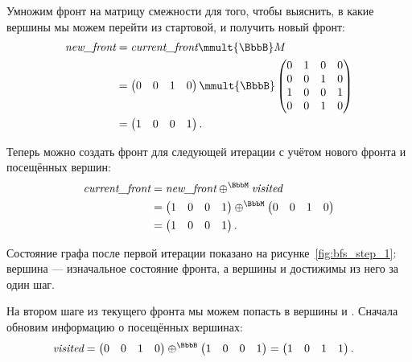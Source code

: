 \begin{example}
    Умножим фронт на матрицу смежности для того, чтобы выяснить, в какие вершины мы можем перейти из стартовой, и получить новый фронт:
    \begin{align*}
        \emph{new\_front} & = \emph{current\_front} \mmult{\BbbB} M \\
                          & =
        \begin{pmatrix}
            0 & 0 & 1 & 0
        \end{pmatrix} \mmult{\BbbB}
        \begin{pmatrix}
            0 & 1 & 0 & 0 \\
            0 & 0 & 1 & 0 \\
            1 & 0 & 0 & 1 \\
            0 & 0 & 1 & 0
        \end{pmatrix}                                              \\
                          & =
        \begin{pmatrix}
            1 & 0 & 0 & 1
        \end{pmatrix}.
    \end{align*}

    Теперь можно создать фронт для следующей итерации с учётом нового фронта и посещённых вершин:
    \begin{align*}
        \emph{current\_front} & = \emph{new\_front} \oplus^\BbbM \emph{visited}
        \\
                              & =
        \begin{pmatrix}
            1 & 0 & 0 & 1
        \end{pmatrix}\oplus^\BbbM
        \begin{pmatrix}
            0 & 0 & 1 & 0
        \end{pmatrix}                                                          \\
                              & =
        \begin{pmatrix}
            1 & 0 & 0 & 1
        \end{pmatrix}.
    \end{align*}

    Состояние графа после первой итерации показано на рисунке~\ref{fig:bfs_step_1}: вершина  --- изначальное состояние фронта, а вершины  и  достижимы из него за один шаг.

    На втором шаге из текущего фронта мы можем попасть в вершины  и .
    Сначала обновим информацию о посещённых вершинах:
    \begin{align*}
        \emph{visited} & =
        \begin{pmatrix}
            0 & 0 & 1 & 0
        \end{pmatrix}\oplus^\BbbB
        \begin{pmatrix}
            1 & 0 & 0 & 1
        \end{pmatrix} =
        \begin{pmatrix}
            1 & 0 & 1 & 1
        \end{pmatrix}.
    \end{align*}


\end{example}
